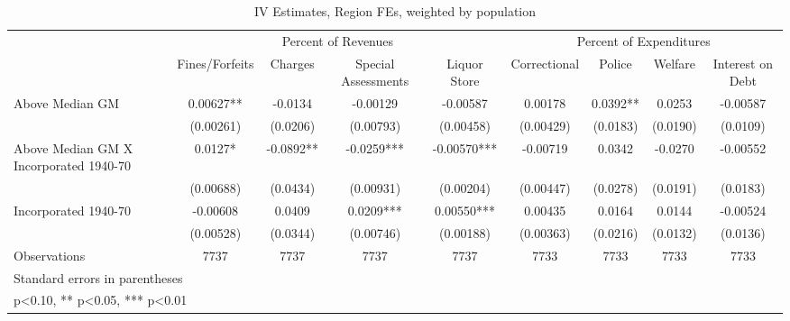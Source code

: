 \begin{table}[htbp]\centering
\def\sym#1{\ifmmode^{#1}\else\(^{#1}\)\fi}
\caption{IV Estimates, Region FEs, weighted by population}
\begin{tabular}{l*{8}{c}}
\toprule
                    &\multicolumn{4}{c}{Percent of Revenues}                        &\multicolumn{4}{c}{Percent of Expenditures}                    \\\cmidrule(lr){2-5}\cmidrule(lr){6-9}
                    &\multicolumn{1}{c}{Fines/Forfeits}&\multicolumn{1}{c}{Charges}&\multicolumn{1}{c}{Special Assessments}&\multicolumn{1}{c}{Liquor Store}&\multicolumn{1}{c}{Correctional}&\multicolumn{1}{c}{Police}&\multicolumn{1}{c}{Welfare}&\multicolumn{1}{c}{Interest on Debt}\\
\midrule
Above Median GM     &     0.00627** &     -0.0134   &    -0.00129   &    -0.00587   &     0.00178   &      0.0392** &      0.0253   &    -0.00587   \\
                    &   (0.00261)   &    (0.0206)   &   (0.00793)   &   (0.00458)   &   (0.00429)   &    (0.0183)   &    (0.0190)   &    (0.0109)   \\
\addlinespace
Above Median GM X Incorporated 1940-70&      0.0127*  &     -0.0892** &     -0.0259***&    -0.00570***&    -0.00719   &      0.0342   &     -0.0270   &    -0.00552   \\
                    &   (0.00688)   &    (0.0434)   &   (0.00931)   &   (0.00204)   &   (0.00447)   &    (0.0278)   &    (0.0191)   &    (0.0183)   \\
\addlinespace
Incorporated 1940-70&    -0.00608   &      0.0409   &      0.0209***&     0.00550***&     0.00435   &      0.0164   &      0.0144   &    -0.00524   \\
                    &   (0.00528)   &    (0.0344)   &   (0.00746)   &   (0.00188)   &   (0.00363)   &    (0.0216)   &    (0.0132)   &    (0.0136)   \\
\midrule
Observations        &        7737   &        7737   &        7737   &        7737   &        7733   &        7733   &        7733   &        7733   \\
\bottomrule
\multicolumn{9}{l}{\footnotesize Standard errors in parentheses}\\
\multicolumn{9}{l}{\footnotesize * p<0.10, ** p<0.05, *** p<0.01}\\
\end{tabular}
\end{table}
